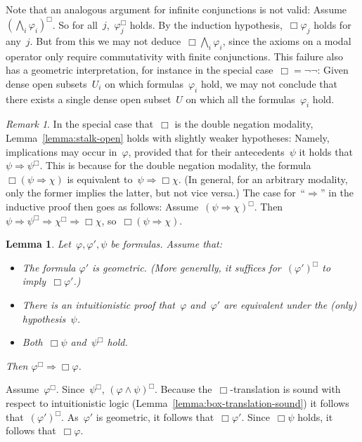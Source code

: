 \documentclass[10pt,reqno,a4paper]{amsbook}
\makeatletter
\theoremstyle{definition}
\theoremstyle{plain}
\newtheorem{lemma}[defn]{Lemma}
\theoremstyle{remark}
\newtheorem{rem}[defn]{Remark}
\newcommand{\?}{\,{:}\,}
\renewcommand{\_}{\mathpunct{.}\,}
\renewenvironment{proof}[1][\proofname]{\par
  \pushQED{\qed}%
  \normalfont \topsep6\p@\@plus6\p@\relax
  \trivlist
  \item[\hskip\labelsep
        \itshape
    #1\@addpunct{.}]\ignorespaces
}{%
  \popQED\endtrivlist\@endpefalse
}
\makeatother
\begin{document}
Note that an analogous argument for infinite conjunctions is not valid:
Assume~$(\bigwedge_i \varphi_i)^\Box$. So for all~$j$,~$\varphi_j^\Box$ holds.
By the induction hypothesis,~$\Box\varphi_j$ holds for any~$j$. But from this
we may not deduce~$\Box\bigwedge_i \varphi_i$, since the axioms on a modal
operator only require commutativity with finite conjunctions. This failure also
has a geometric interpretation, for instance in the special case~$\Box =
\neg\neg$: Given dense open subsets~$U_i$ on which formulas~$\varphi_i$ hold,
we may not conclude that there exists a single dense open subset~$U$ on which
all the formulas~$\varphi_i$ hold.

\begin{rem}In the special case that~$\Box$ is the double negation modality,
Lemma~\ref{lemma:stalk-open} holds with slightly weaker hypotheses: Namely, implications may occur
in~$\varphi$, provided that for their antecedents~$\psi$ it holds that~$\psi
\Rightarrow \psi^\Box$. This is because for the double negation modality,
the formula~$\Box(\psi \Rightarrow \chi)$ is equivalent to~$\psi \Rightarrow
\Box\chi$. (In general, for an arbitrary modality, only the former implies the latter, but not vice versa.) The case
for~``$\Rightarrow$'' in the inductive proof then goes as follows:
Assume~$(\psi \Rightarrow \chi)^\Box$. Then~$\psi \Rightarrow \psi^\Box
\Rightarrow \chi^\Box \Rightarrow \Box\chi$, so~$\Box(\psi \Rightarrow \chi)$.
\end{rem}

\begin{lemma}\label{lemma:stalk-open-with-hypothesis}
Let~$\varphi, \varphi', \psi$ be formulas. Assume that:
\begin{itemize}
\item The formula $\varphi'$ is geometric. (More generally, it suffices for~$(\varphi')^\Box$
to imply~$\Box\varphi'$.)
\item There is an intuitionistic proof that~$\varphi$
and~$\varphi'$ are equivalent under the (only) hypothesis~$\psi$.
\item Both~$\Box\psi$ and~$\psi^\Box$ hold.
\end{itemize}
Then $\varphi^\Box \Rightarrow \Box\varphi$.
\end{lemma}
\begin{proof}
Assume~$\varphi^\Box$. Since~$\psi^\Box$, $(\varphi \wedge \psi)^\Box$. Because
the~$\Box$-translation is sound with respect to intuitionistic logic
(Lemma~\ref{lemma:box-translation-sound})
it follows that~$(\varphi')^\Box$. As~$\varphi'$ is geometric, it follows
that~$\Box\varphi'$. Since~$\Box\psi$ holds, it follows that~$\Box\varphi$.
\end{proof}
\end{document}
